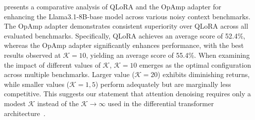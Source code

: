  presents a comparative analysis of QLoRA and the OpAmp adapter for enhancing the Llama3.1-8B-base model across various noisy context benchmarks. 
The OpAmp adapter demonstrates consistent superiority over QLoRA across all evaluated benchmarks. 
Specifically, QLoRA achieves an average score of 52.4\%, whereas the OpAmp adapter significantly enhances performance, with the best results observed at $\mathcal{K}=10$, yielding an average score of 55.4\%. 
When examining the impact of different values of $\mathcal{K}$, $\mathcal{K}=10$ emerges as the optimal configuration across multiple benchmarks. 
Larger value ($\mathcal{K}=20$) exhibits diminishing returns, while smaller values ($\mathcal{K}=1, 5$) perform adequately but are marginally less competitive. 
This suggests our statement that attention denoising requires only a modest $\mathcal{K}$ instead of the $\mathcal{K} \rightarrow \infty$ used in the differential transformer architecture~\cite{ye2025difftrans}.

\begin{table}[tb!]
\centering
\setlength\tabcolsep{2.0pt}
\caption{Ablation studies on FaithEval using Llama3.1-8B-base as the base model.
We bold the highest scores.}
\label{table:ab_study_faitheval}
\end{table}

